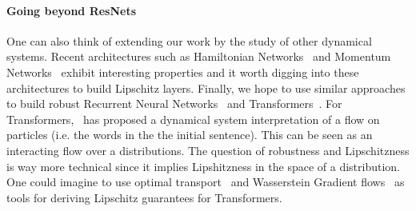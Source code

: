 \paragraph{Going beyond ResNets} One can also think of extending  our work by the study of  other dynamical systems. Recent architectures such as Hamiltonian Networks~\citep{greydanus2019hamiltonian} and Momentum Networks~\citep{sander2021momentum} exhibit interesting properties and it worth digging into these architectures to build Lipschitz layers.
Finally, we hope to use similar approaches to build robust Recurrent Neural Networks~\citep{sherstinsky2020fundamentals} and Transformers~\citep{vaswani2017attention}. For Transformers,~\citet{xxx} has proposed a dynamical system interpretation of a flow on particles (i.e. the words in the the initial sentence). This can be seen as an interacting flow over a distributions. The question of robustness and Lipschitzness is way more technical since it implies Lipshitzness in the space of a distribution. One could imagine to use optimal transport~\citep{villani2003topics} and Wasserstein Gradient flows~\citep{ambrosio2005gradient} as tools for deriving Lipschitz guarantees for Transformers.



